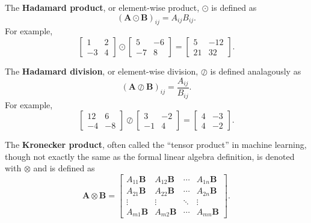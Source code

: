 \documentclass[12pt]{report}
\theoremstyle{definition}
\theoremstyle{remark}
\begin{document}
The \textbf{Hadamard product}, or element-wise product, $\odot$ is defined as
\begin{equation}
    ({{\mathbf{A} \odot \mathbf{B}}})_{ij} = A_{ij}B_{ij}.
\end{equation}
For example,
\begin{equation}
    \begin{bmatrix}
        1 & 2 \\
        -3 & 4
    \end{bmatrix} \odot \begin{bmatrix}
        5 & -6 \\
        -7 & 8
    \end{bmatrix} = \begin{bmatrix}
        5 & -12 \\
        21 & 32
    \end{bmatrix}.
\end{equation}

The \textbf{Hadamard division}, or element-wise division, $\oslash$ is defined analagously as
\begin{equation}
    ({{\mathbf{A} \oslash \mathbf{B}}})_{ij} = \frac{A_{ij}}{B_{ij}}.
\end{equation}
For example,
\begin{equation}
    \begin{bmatrix}
        12 & 6 \\
        -4 & -8
    \end{bmatrix} \oslash \begin{bmatrix}
        3 & -2 \\
        -1 & 4
    \end{bmatrix} = \begin{bmatrix}
        4 & -3 \\
        4 & -2
    \end{bmatrix}.
\end{equation}

The \textbf{Kronecker product}, often called the ``tensor product'' in machine learning, though not exactly the same as the formal linear algebra definition, is denoted with $\otimes$ and is defined as
\begin{equation}
    \mathbf{A} \otimes \mathbf{B} = \begin{bmatrix}
        A_{11}\mathbf{B} & A_{12}\mathbf{B} & \cdots & A_{1n}\mathbf{B} \\
        A_{21}\mathbf{B} & A_{22}\mathbf{B} & \cdots & A_{2n}\mathbf{B} \\
        \vdots & \vdots & \ddots & \vdots \\
        A_{m1}\mathbf{B} & A_{m2}\mathbf{B} & \cdots & A_{mn}\mathbf{B}
    \end{bmatrix}.
\end{equation}
\end{document}

